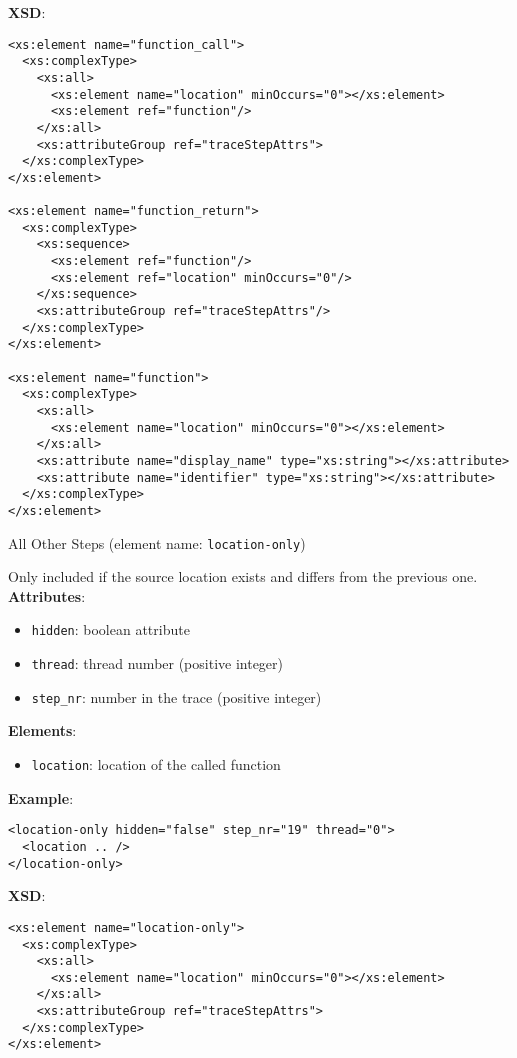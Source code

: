 \documentclass[12pt]{article}
\begin{document}
\noindent\textbf{XSD}:
\begin{verbatim}
<xs:element name="function_call">
  <xs:complexType>
    <xs:all>
      <xs:element name="location" minOccurs="0"></xs:element>
      <xs:element ref="function"/>
    </xs:all>
    <xs:attributeGroup ref="traceStepAttrs">
  </xs:complexType>
</xs:element>

<xs:element name="function_return">
  <xs:complexType>
    <xs:sequence>
      <xs:element ref="function"/>
      <xs:element ref="location" minOccurs="0"/>
    </xs:sequence>
    <xs:attributeGroup ref="traceStepAttrs"/>
  </xs:complexType>
</xs:element>

<xs:element name="function">
  <xs:complexType>
    <xs:all>
      <xs:element name="location" minOccurs="0"></xs:element>
    </xs:all>
    <xs:attribute name="display_name" type="xs:string"></xs:attribute>
    <xs:attribute name="identifier" type="xs:string"></xs:attribute>
  </xs:complexType>
</xs:element>
\end{verbatim}


\begin{center}
  {\Large All Other Steps} (element name: \texttt{location-only})
\end{center}

\noindent Only included if the source location exists and differs from the previous one.\\

\noindent\textbf{Attributes}:
\begin{itemize}
\item \texttt{hidden}: boolean attribute
\item \texttt{thread}: thread number (positive integer)
\item \texttt{step\_nr}: number in the trace (positive integer)
\end{itemize}

\noindent\textbf{Elements}:
\begin{itemize}
\item \texttt{location}: location of the called function
\end{itemize}

\noindent\textbf{Example}:
\begin{verbatim}
<location-only hidden="false" step_nr="19" thread="0">
  <location .. />
</location-only>
\end{verbatim}

\noindent\textbf{XSD}:
\begin{verbatim}
<xs:element name="location-only">
  <xs:complexType>
    <xs:all>
      <xs:element name="location" minOccurs="0"></xs:element>
    </xs:all>
    <xs:attributeGroup ref="traceStepAttrs">
  </xs:complexType>
</xs:element>
\end{verbatim}
\end{document}
